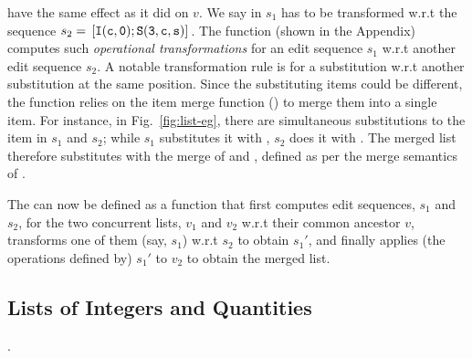 \begin{itemize}
		have the same effect as it did on $v$. We say  in $s_1$ has to be
		transformed w.r.t the sequence $s_2 = \,{\tt [I(c,0);S(3,c,s)]}\,$.  The function
		 (shown in the Appendix) computes such
		\emph{operational transformations} for an edit sequence $s_1$ w.r.t another
		edit sequence $s_2$. A notable transformation rule is for a substitution
		w.r.t another substitution at the same position. Since the substituting
		items could be different, the function relies on the item merge function
		() to merge them into a single item. For instance, in
		Fig.~\ref{fig:list-eg}, there are simultaneous substitutions to the item
		 in $s_1$ and $s_2$; while $s_1$ substitutes it with , $s_2$ does
		it with . The merged list therefore substitutes  with the merge
		of  and , defined as per the merge semantics of .
\end{itemize}
The  can now be defined as a function that first
computes edit sequences, $s_1$ and $s_2$, for the two concurrent
lists, $v_1$ and $v_2$ w.r.t their common ancestor $v$, transforms one
of them (say, $s_1$) w.r.t $s_2$ to obtain $s_1'$, and finally applies
(the operations defined by) $s_1'$ to $v_2$ to obtain the merged list.

\subsection{Lists of Integers and Quantities}.

